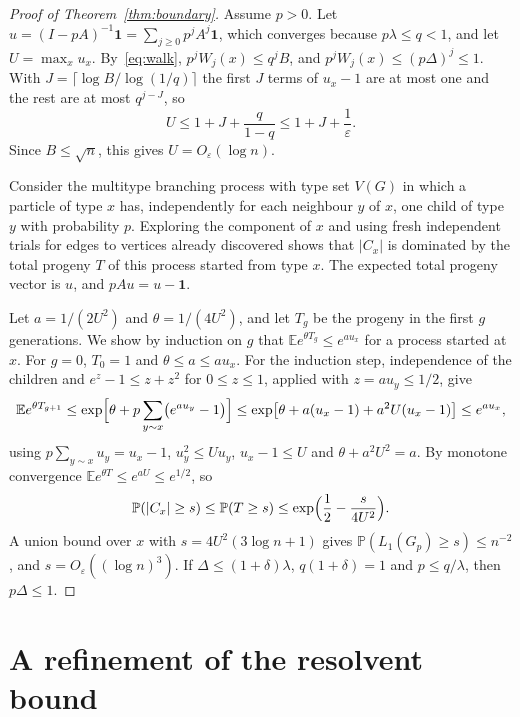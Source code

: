 \documentclass[11pt]{amsart}
\theoremstyle{remark}
\newcommand{\PP}{\mathbb{P}}
\newcommand{\EE}{\mathbb{E}}
\newcommand{\one}{\mathbf{1}}
\begin{document}
\begin{proof}[Proof of Theorem~\ref{thm:boundary}]
Assume $p>0$. Let $u=(I-pA)^{-1}\one=\sum_{j\ge0}p^jA^j\one$, which converges because $p\lambda\le q<1$, and let
$U=\max_xu_x$. By~\eqref{eq:walk}, $p^jW_j(x)\le q^jB$, and $p^jW_j(x)\le(p\Delta)^j\le1$. With
$J=\lceil\log B/\log(1/q)\rceil$ the first $J$ terms of $u_x-1$ are at most one and the rest are at most
$q^{j-J}$, so
\begin{equation}\label{eq:U}
U\le1+J+\frac q{1-q}\le1+J+\frac1\varepsilon.
\end{equation}
Since $B\le\sqrt n$, this gives $U=O_\varepsilon(\log n)$.

Consider the multitype branching process with type set $V(G)$ in which a particle of type $x$ has, independently for
each neighbour $y$ of $x$, one child of type $y$ with probability $p$. Exploring the component of $x$ and using fresh
independent trials for edges to vertices already discovered shows that $|C_x|$ is dominated by the total progeny $T$ of
this process started from type $x$. The expected total progeny vector is $u$, and $pAu=u-\one$.

Let $a=1/(2U^2)$ and $\theta=1/(4U^2)$, and let $T_g$ be the progeny in the first $g$ generations. We show by induction
on $g$ that $\EE e^{\theta T_g}\le e^{au_x}$ for a process started at $x$. For $g=0$, $T_0=1$ and $\theta\le a\le
au_x$. For the induction step, independence of the children and $e^z-1\le z+z^2$ for $0\le z\le1$, applied with
$z=au_y\le1/2$, give
\[
\EE e^{\theta T_{g+1}}\le\exp\Bigl[\theta+p\sum_{y\sim x}\bigl(e^{au_y}-1\bigr)\Bigr]
\le\exp\bigl[\theta+a(u_x-1)+a^2U(u_x-1)\bigr]\le e^{au_x},
\]
using $p\sum_{y\sim x}u_y=u_x-1$, $u_y^2\le Uu_y$, $u_x-1\le U$ and $\theta+a^2U^2=a$. By monotone convergence
$\EE e^{\theta T}\le e^{aU}\le e^{1/2}$, so
\[
\PP(|C_x|\ge s)\le\PP(T\ge s)\le\exp\Bigl(\frac12-\frac s{4U^2}\Bigr).
\]
A union bound over $x$ with $s=4U^2(3\log n+1)$ gives $\PP(L_1(G_p)\ge s)\le n^{-2}$, and $s=O_\varepsilon((\log
n)^3)$. If $\Delta\le(1+\delta)\lambda$, $q(1+\delta)=1$ and $p\le q/\lambda$, then $p\Delta\le1$.
\end{proof}

\section{A refinement of the resolvent bound}\label{sec:refine}
\end{document}

